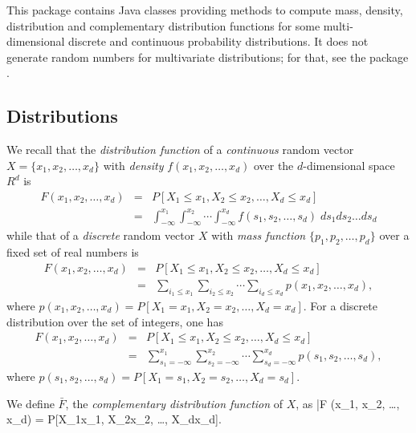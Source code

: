 

This package contains Java classes providing methods to 
compute mass, density, distribution and complementary
distribution functions for some multi-dimensional discrete
and continuous probability distributions.
It does not generate random numbers for multivariate distributions;
for that, see the package .

\subsection* {Distributions}

We recall that the {\em distribution function\/} of a {\em continuous\/} random
vector $X= \{x_1, x_2, \ldots, x_d\}$ with {\em density\/} $f(x_1, x_2, \ldots,
x_d)$ over the
 $d$-dimensional space $R^d$  is
\begin{eqnarray}
  F(x_1, x_2, \ldots, x_d) &=& P[X_1\le x_1, X_2\le x_2, \ldots, X_d\le x_d] \\[6pt]
    &=&
  \int_{-\infty}^{x_1}\int_{-\infty}^{x_2} \cdots  \int_{-\infty}^{x_d} f(s_1, s_2,
 \ldots, s_d)\; ds_1 ds_2 \ldots ds_d    \label{eq:FDist}
\end{eqnarray}
while that of a {\em discrete\/} random vector $X$ with {\em mass function\/}
 $\{p_1, p_2, \ldots, p_d\}$ over a fixed set of real numbers is
\begin{eqnarray}
  F(x_1, x_2, \ldots, x_d) &=& P[X_1\le x_1, X_2\le x_2, \ldots, X_d\le x_d] \\[6pt]
   &=& \sum_{i_1\le x_1}\sum_{i_2\le x_2} \cdots
   \sum_{i_d\le x_d} p(x_1, x_2, \ldots, x_d),     \label{eq:FDistDisc}
\end{eqnarray}
where $p(x_1, x_2, \ldots, x_d) = P[X_1 = x_1, X_2 = x_2, \ldots, X_d = x_d]$.
For a discrete distribution over the set of integers, one has
\begin{eqnarray}
  F (x_1, x_2, \ldots, x_d) &=& P[X_1\le x_1, X_2\le x_2, \ldots, X_d\le x_d] \\[6pt]
   &=& \sum_{s_1=-\infty}^{x_1} \sum_{s_2=-\infty}^{x_2} \cdots
   \sum_{s_d=-\infty}^{x_d} p(s_1, s_2, \ldots, s_d),   \label{eq:FDistDiscInt}
\end{eqnarray}
where $p(s_1, s_2, \ldots, s_d) = P[X_1=s_1, X_2=s_2, \ldots, X_d=s_d]$.

We define $\bar{F}$, the {\em complementary distribution function\/} 
of $X$, as
\eq
 \bar{F} (x_1, x_2, \ldots, x_d) = P[X_1\ge x_1, X_2\ge x_2, \ldots, X_d\ge x_d].
\endeq
